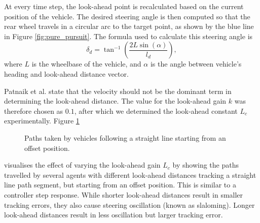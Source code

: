 At every time step, the look-ahead point is recalculated  based on the current position of the vehicle.
The desired steering angle is then computed so that the rear wheel travels in a circular arc to the target point, as shown by the blue line in Figure \ref{fig:pure_pursuit}. The formula used to calculate this steering angle is 
\begin{equation}
    \delta_d = \tan^{-1} \left( \frac{2L\sin(\alpha)}{l_d} \right),
\end{equation}
where $L$ is the wheelbase of the vehicle, and $\alpha$ is the angle between vehicle's heading and look-ahead distance vector.
%     

Patnaik et al. \cite{Patnaik2020} state that the velocity should not be the dominant term in determining the look-ahead distance. 
The value for the look-ahead gain $k$ was therefore chosen as $0.1$, after which we determined the look-ahead constant $L_{c}$ experimentally.
Figure \ref{fig:lfc}
\begin{figure}[htb!]
    \centering
    
    \caption[Paths taken by vehicles following a straight line starting from an offset position]{Paths taken by vehicles following a straight line starting from an offset position.}
    \label{fig:lfc}
\end{figure}
visualises the effect of varying the look-ahead gain $L_{c}$ by showing the paths travelled by several agents with different look-ahead distances tracking a straight line path segment, but starting from an offset position.
This is similar to a controller step response.
While shorter look-ahead distances result in smaller tracking errors, they also cause steering oscillation (known as slaloming).
Longer look-ahead distances result in less oscillation but larger tracking error.

